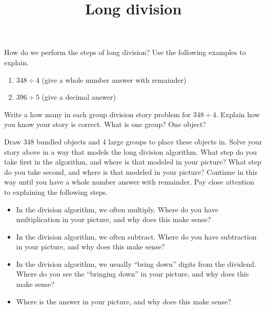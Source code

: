 \documentclass[nooutcomes,noauthor, handout]{ximera}
\title{Long division}
\begin{document}
\begin{abstract}
\end{abstract}

\maketitle

\begin{problem}
How do we perform the steps of long division? Use the following examples to explain.
\begin{enumerate}
\item $348 \div 4$ (give a whole number answer with remainder)
\item $396 \div 5$ (give a decimal answer)
\end{enumerate}
\end{problem}


\begin{problem}
Write a how many in each group division story problem for $348 \div 4$. Explain how you know your story is correct. What is one group? One object?
\end{problem}


\begin{problem}
Draw $348$ bundled objects and $4$ large groups to place these objects in. Solve your story above in a way that models the long division algorithm. What step do you take first in the algorithm, and where is that modeled in your picture? What step do you take second, and where is that modeled in your picture? Continue in this way until you have a whole number answer with remainder. Pay close attention to explaining the following steps.
\begin{itemize}
	\item In the division algorithm, we often multiply. Where do you have multiplication in your picture, and why does this make sense?
	\item In the division algorithm, we often subtract. Where do you have subtraction in your picture, and why does this make sense?
	\item In the division algorithm, we usually ``bring down'' digits from the dividend. Where do you see the ``bringing down'' in your picture, and why does this make sense?
	\item Where is the answer in your picture, and why does this make sense?
\end{itemize}

\end{problem}
\end{document}
